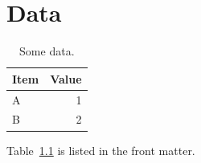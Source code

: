 \chapter{Data}\label{app:data}
\begin{table}[h]
  \centering
  \begin{tabular}{lr}
    Item & Value \\ \hline
    A & 1 \\
    B & 2 \\
  \end{tabular}
  \caption{Some data.}\label{tab:data}
\end{table}
Table~\ref{tab:data} is listed in the front matter.
